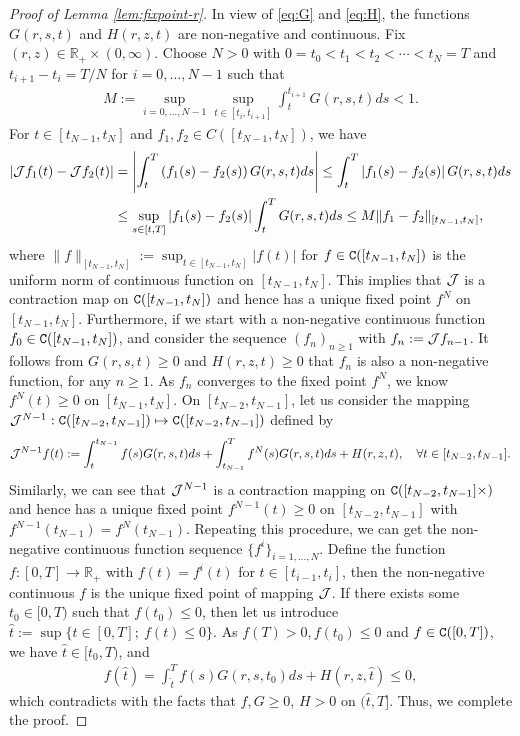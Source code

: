 \documentclass[11pt,times,letter]{article}
\newcommand{\R}{\mathds{R}}
\newcommand{\C}{{\tt{C}}}
\numberwithin{equation}{section}
\begin{document}
\begin{proof}[Proof of Lemma \ref{lem:fixpoint-r}]
In view of \eqref{eq:G} and \eqref{eq:H}, the functions $G(r,s,t)$ and $H(r,z,t)$ are non-negative and continuous.  Fix $(r,z)\in \R_+\times (0,\infty)$. Choose $N>0$ with $0=t_0<t_1<t_2<\cdots<t_N=T$ and $t_{i+1}-t_i=T/N$ for $i=0,\ldots,N-1$ such that
\begin{align*}
M:=\sup_{i=0,...,N-1}  \sup_{t \in  [t_i,t_{i+1}]} \int_{t}^{t_{i+1}}G(r,s,t) ds<1.
\end{align*}
For $t\in [t_{N-1},t_N]$ and $f_1,f_2\in C([t_{N-1},t_N])$, we have 
\begin{align*}
|{\cal J}f_1(t)-{\cal J}f_2(t)|&=\left|\int_t^T \left(f_1(s)-f_2(s)\right) G(r,s,t)ds\right|\leq \int_t^T \left|f_1(s)-f_2(s)\right|G(r,s,t)ds\\
&\leq \sup_{s\in[t,T]}|f_1(s)-f_2(s)| \int_t^T G(r,s,t)ds\leq M \|f_1-f_2\|_{[t_{N-1},t_N]},
\end{align*}
where $\|f\|_{[t_{N-1},t_N]}:=\sup_{t\in [t_{N-1},t_N]}|f(t)|$ for $f\in\C([t_{N-1},t_N])$ is the uniform norm of continuous function on  $[t_{N-1},t_N]$. This implies that ${\cal J}$ is a contraction map on $\C([t_{N-1},t_N])$ and hence has a unique fixed point $f^N$ on $[t_{N-1},t_N]$. Furthermore, if we start with a non-negative continuous function $f_0\in\C([t_{N-1},t_N])$, and consider the sequence $(f_n)_{n\geq 1}$ with $f_n:={\cal J}f_{n-1}$. It follows from  $G(r,s,t)\geq 0$ and $H(r,z,t)\geq 0$ that $f_n$ is also a non-negative function, for any $n\geq 1$. As $f_n$ converges to the fixed point $f^N$, we know $f^N(t)\geq 0$ on $[t_{N-1},t_N]$. On $[t_{N-2},t_{N-1}]$, let us consider the mapping ${\cal J}^{N-1}:\C([t_{N-2},t_{N-1}])\mapsto\C([t_{N-2},t_{N-1}])$ defined by
\begin{align*}
{\cal J}^{N-1}f(t):=\int_t^{t_{N-1}}f(s)G(r,s,t)ds+\int_{t_{N-1}}^{T} f^N(s)G(r,s,t)ds+H(r,z,t),\quad \forall t\in[t_{N-2},t_{N-1}].
\end{align*}
Similarly, we can see that ${\cal J}^{N-1}$ is a contraction mapping on $\C([t_{N-2},t_{N-1}]\times )$ and hence has a unique fixed point $f^{N-1}(t)\geq 0$ on $[t_{N-2},t_{N-1}]$ with $f^{N-1}(t_{N-1})=f^N(t_{N-1})$. Repeating this procedure, we can get the non-negative continuous function sequence $\{f^i\}_{i=1,\ldots,N}$. Define the function $f:[0,T]\to \R_+$ with $f(t)=f^i(t)$ for $t\in[t_{i-1},t_i]$, then the non-negative  continuous $f$ is the unique fixed point of mapping ${\cal J}$. If there exists some $t_0\in[0,T)$ such that $f(t_0)\leq0$, then let us introduce $\hat{t}:=\sup\{t\in[0,T];~f(t)\leq 0\}$. As $f(T)>0,f(t_0)\leq 0$ and $f\in\C([0,T])$, we have $\hat{t}\in[t_0,T)$, and 
\begin{align*}
f(\hat{t})=\int_{\hat{t}}^T f(s)G(r,s,t_0)ds+H(r,z,\hat{t})\leq 0,
\end{align*}
which contradicts with the facts that $f,G\geq 0$, $H>0$ on $(\hat{t},T]$. Thus, we complete the proof.
\end{proof}
\end{document}
